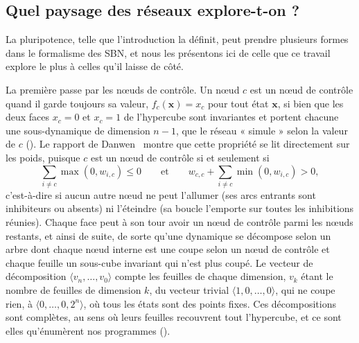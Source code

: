 \subsection{Quel paysage des réseaux explore-t-on ?}
\label{sec:paysage}

La pluripotence, telle que l'introduction la définit, peut prendre plusieurs formes dans le formalisme des SBN, et nous les présentons ici de celle que ce travail explore le plus à celles qu'il laisse de côté.

La première passe par les nœuds de contrôle.
Un nœud $c$ est un nœud de contrôle quand il garde toujours sa valeur, $f_c(\mathbf{x}) = x_c$ pour tout état $\mathbf{x}$, si bien que les deux faces $x_c = 0$ et $x_c = 1$ de l'hypercube sont invariantes et portent chacune une sous-dynamique de dimension $n-1$, que le réseau « simule » selon la valeur de $c$ ().
Le rapport de Danwen~\cite{wu2024} montre que cette propriété se lit directement sur les poids, puisque $c$ est un nœud de contrôle si et seulement si
\begin{equation}
\sum_{i \neq c} \max(0, w_{i,c}) \le 0
\qquad \text{et} \qquad
w_{c,c} + \sum_{i \neq c} \min(0, w_{i,c}) > 0 ,
\end{equation}
c'est-à-dire si aucun autre nœud ne peut l'allumer (ses arcs entrants sont inhibiteurs ou absents) ni l'éteindre (sa boucle l'emporte sur toutes les inhibitions réunies).
Chaque face peut à son tour avoir un nœud de contrôle parmi les nœuds restants, et ainsi de suite, de sorte qu'une dynamique se décompose selon un arbre dont chaque nœud interne est une coupe selon un nœud de contrôle et chaque feuille un sous-cube invariant qui n'est plus coupé.
Le vecteur de décomposition $\langle v_n, \dots, v_0 \rangle$ compte les feuilles de chaque dimension, $v_k$ étant le nombre de feuilles de dimension $k$, du vecteur trivial $\langle 1, 0, \dots, 0 \rangle$, qui ne coupe rien, à $\langle 0, \dots, 0, 2^n \rangle$, où tous les états sont des points fixes.
Ces décompositions sont complètes, au sens où leurs feuilles recouvrent tout l'hypercube, et ce sont elles qu'énumèrent nos programmes ().


